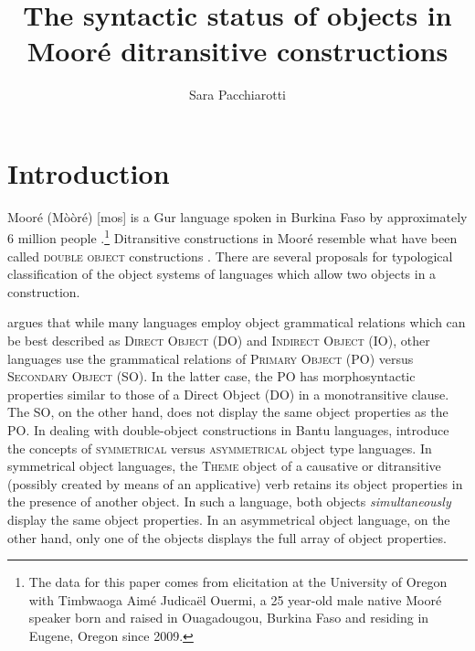 \documentclass[output=paper]{langsci/langscibook}
\title{The syntactic status of objects in Mooré ditransitive constructions}
\author{%
 Sara Pacchiarotti\affiliation{University of Oregon}
}
\begin{document}


\section{Introduction}\label{§1:introduction.pacchiarotti}

Mooré (Mòòré) [mos] is a Gur language spoken in Burkina Faso by approximately 6 million people \citep{lewisetal2016}.\footnote{The data for this paper comes from elicitation at the University of Oregon with Timbwaoga Aimé Judicaël Ouermi, a 25 year-old male native  Mooré speaker born and raised in Ouagadougou, Burkina Faso and residing in Eugene, Oregon since 2009.} Ditransitive constructions in Mooré resemble what have been called \textsc{double object} constructions \citep{dryer1986,dryer2007,goldberg1995}. There are several proposals for typological classification of the object systems of languages which allow two objects in a construction.

\citet{dryer1986} argues that while many languages employ object grammatical relations which can be best described as \textsc{Direct Object} (DO) and \textsc{Indirect Object} (IO), other languages use the grammatical relations of \textsc{Primary Object} (PO) versus \textsc{Secondary Object} (SO). In the latter case, the PO has morphosyntactic properties similar to those of a Direct Object (DO) in a monotransitive clause. The SO, on the other hand, does not display the same object properties as the PO. In dealing with double-object constructions in Bantu languages, \citet{bresnanmoshi1990} introduce the concepts of \textsc{symmetrical} versus \textsc{asymmetrical} object type languages. In symmetrical object languages, the \textsc{Theme} object of a causative or ditransitive (possibly created by means of an applicative) verb retains its object properties in the presence of another object. In such a language, both objects \textit{simultaneously} display the same object properties. In an asymmetrical object language, on the other hand, only one of the objects displays the full array of object properties. 
\end{document}
